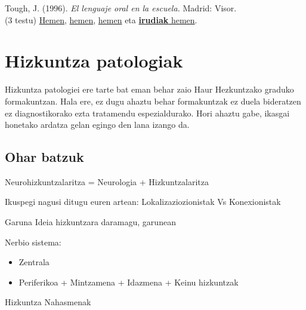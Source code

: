 \documentclass[
]{book}
\providecommand{\tightlist}{%
  \setlength{\itemsep}{0pt}\setlength{\parskip}{0pt}}
\begin{document}
Tough, J. (1996). \emph{El lenguaje oral en la escuela.} Madrid: Visor.\\
(3 testu)
\href{../beste/Proiektua/TOUGH_El\%20uso\%20del\%20lenguaje\%20en\%20los\%20ninos.pdf}{Hemen}, \href{../beste/Proiektua/TOUGH_como\%20hacer\%20una\%20valoracion\%20del\%20uso\%20del\%20lenguaje\%20en\%20el\%20nino.pdf}{hemen}, \href{../beste/Proiektua/TOUGH_utilizacion\%20de\%20los\%20cuadernillos\%20de\%20dibujos.pdf}{hemen} eta \href{../beste/Proiektua/TOUGH_Katutxo_beltza-irudiak.pdf}{\textbf{irudiak} hemen}.

\hypertarget{hizkuntza-patologiak}{%
\chapter{Hizkuntza patologiak}\label{hizkuntza-patologiak}}

Hizkuntza patologiei ere tarte bat eman behar zaio Haur Hezkuntzako graduko formakuntzan. Hala ere, ez dugu ahaztu behar formakuntzak ez duela bideratzen ez diagnostikorako ezta tratamendu espezialdurako. Hori ahaztu gabe, ikasgai honetako ardatza gelan egingo den lana izango da.

\hypertarget{ohar-batzuk}{%
\section{Ohar batzuk}\label{ohar-batzuk}}

Neurohizkuntzalaritza = Neurologia + Hizkuntzalaritza

Ikuspegi nagusi ditugu euren artean: Lokalizaziozionistak Vs Konexionistak

Garuna
Ideia hizkuntzara daramagu, garunean

Nerbio sistema:

\begin{itemize}
\tightlist
\item
  Zentrala
\item
  Periferikoa
  + Mintzamena
  + Idazmena
  + Keinu hizkuntzak
\end{itemize}

Hizkuntza Nahasmenak
\end{document}
